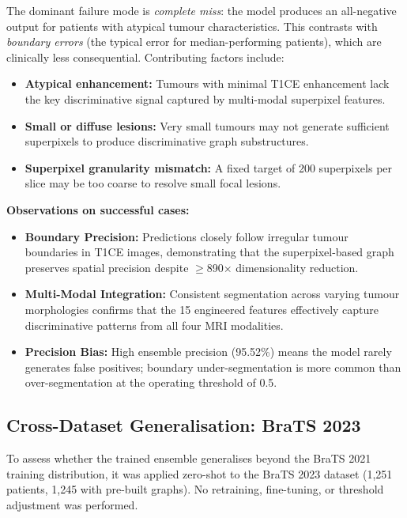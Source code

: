 The dominant failure mode is \textit{complete miss}: the model produces an all-negative output for patients with atypical tumour characteristics. This contrasts with \textit{boundary errors} (the typical error for median-performing patients), which are clinically less consequential. Contributing factors include:
\begin{itemize}
    \item \textbf{Atypical enhancement:} Tumours with minimal T1CE enhancement lack the key discriminative signal captured by multi-modal superpixel features.
    \item \textbf{Small or diffuse lesions:} Very small tumours may not generate sufficient superpixels to produce discriminative graph substructures.
    \item \textbf{Superpixel granularity mismatch:} A fixed target of 200 superpixels per slice may be too coarse to resolve small focal lesions.
\end{itemize}

\textbf{Observations on successful cases:}
\begin{itemize}
    \item \textbf{Boundary Precision:} Predictions closely follow irregular tumour boundaries in T1CE images, demonstrating that the superpixel-based graph preserves spatial precision despite $\geq$890$\times$ dimensionality reduction.
    \item \textbf{Multi-Modal Integration:} Consistent segmentation across varying tumour morphologies confirms that the 15 engineered features effectively capture discriminative patterns from all four MRI modalities.
    \item \textbf{Precision Bias:} High ensemble precision (95.52\%) means the model rarely generates false positives; boundary under-segmentation is more common than over-segmentation at the operating threshold of 0.5.
\end{itemize}


\subsection{Cross-Dataset Generalisation: BraTS 2023}

To assess whether the trained ensemble generalises beyond the BraTS 2021 training distribution, it was applied zero-shot to the BraTS 2023 dataset (1,251 patients, 1,245 with pre-built graphs). No retraining, fine-tuning, or threshold adjustment was performed.

